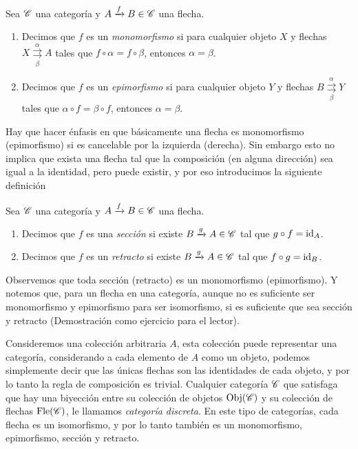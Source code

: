 \documentclass{comunicaciones}
\begin{document}
\begin{dfn}
    Sea $\mathscr C$ una categoría y $A\xrightarrow{f}B\in\mathscr C$ una flecha. 
    \begin{enumerate}
        \item Decimos que $f$ es un \emph{monomorfismo} si para cualquier objeto $X$ y flechas $X\overset{\alpha}{\underset{\beta}{\rightrightarrows}}A$
              tales que $f\circ\alpha=f\circ\beta$, entonces $\alpha=\beta$. 
        \item Decimos que $f$ es un \emph{epimorfismo} si para cualquier objeto $Y$ y flechas $B\overset{\alpha}{\underset{\beta}{\rightrightarrows}}Y$
              tales que $\alpha\circ f=\beta\circ f$, entonces $\alpha=\beta$.
    \end{enumerate}
\end{dfn}
Hay que hacer énfasis en que básicamente una flecha es monomorfismo (epimorfismo) si es cancelable por la izquierda (derecha). Sin embargo esto no implica
que exista una flecha tal que la composición (en alguna dirección) sea igual a la identidad, pero puede existir, y por eso introducimos la siguiente definición
\begin{dfn}
    Sea $\mathscr C$ una categoría y $A\xrightarrow{f}B\in\mathscr C$ una flecha. 
    \begin{enumerate}
        \item Decimos que $f$ es una \emph{sección} si existe $B\xrightarrow{g}A\in\mathscr C$ tal que $g\circ f=\mathrm{id}_A$. 
        \item Decimos que $f$ es un \emph{retracto} si existe $B\xrightarrow{g}A\in\mathscr C$ tal que $f\circ g=\mathrm{id}_B$.
    \end{enumerate}
\end{dfn}

Observemos que toda sección (retracto) es un monomorfismo (epimorfismo). Y notemos que, para un flecha en una categoría, aunque no es suficiente ser monomorfismo
y epimorfismo para ser isomorfismo, si es suficiente que sea sección y retracto (Demostración como ejercicio para el lector).

\begin{ej}\label{categorías discretas}
    Consideremos una colección arbitraria $A$, esta colección puede representar una categoría, considerando a cada elemento de $A$ como un objeto, podemos
    simplemente decir que las únicas flechas son las identidades de cada objeto, y por lo tanto la regla de composición es trivial.
    Cualquier categoría $\mathscr C$ que satisfaga que hay una biyección entre su colección de objetos $\mathrm{Obj}(\mathscr C)$ y su colección de flechas $\mathrm{Fle}(\mathscr C)$, le llamamos
    \emph{categoría discreta}. En este tipo de categorías, cada flecha es un isomorfismo, y por lo tanto también es un monomorfismo, epimorfismo, sección y retracto.
\end{ej}
\end{document}
